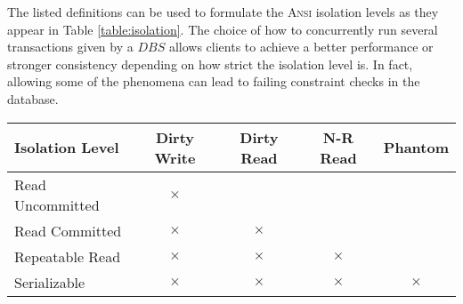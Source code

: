 The listed definitions can be used to formulate the \textsc{Ansi} isolation levels as they appear in Table \ref{table:isolation}. The choice of how to concurrently run several transactions given by a $DBS$ allows clients to achieve a better performance or stronger consistency depending on how strict the isolation level is. In fact, allowing some of the phenomena can lead to failing constraint checks in the database.
\begin{center}
\def\arraystretch{1.4}
	\begin{tabular}{l|c c c c}
		\hline
		\textbf{Isolation Level} & \textbf{Dirty Write} & \textbf{Dirty Read} & \textbf{N-R Read} & \textbf{Phantom} \\
		\hline
		Read Uncommitted & $\times$ & \checkmark & \checkmark & \checkmark \\
		Read Committed & $\times$ & $\times$ & \checkmark & \checkmark \\
		Repeatable Read & $\times$ & $\times$ & $\times$ & \checkmark \\
		Serializable & $\times$ & $\times$ & $\times$ & $\times$ \\
		\hline
	\end{tabular}
\label{table:isolation}
\end{center}

